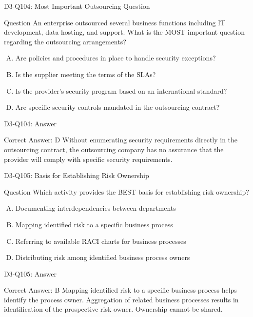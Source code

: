 \documentclass{beamer}
\begin{document}
	\begin{frame}{D3-Q104: Most Important Outsourcing Question}
		\begin{block}{Question}
			An enterprise outsourced several business functions including IT development, data hosting, and support. What is the MOST important question regarding the outsourcing arrangements?
		\end{block}
		\begin{enumerate}[(A)]
			\item Are policies and procedures in place to handle security exceptions?
			\item Is the supplier meeting the terms of the SLAs?
			\item Is the provider's security program based on an international standard?
			\item Are specific security controls mandated in the outsourcing contract?
		\end{enumerate}
	\end{frame}
	\begin{frame}{D3-Q104: Answer}
		\begin{block}{Correct Answer: D}
			Without enumerating security requirements directly in the outsourcing contract, the outsourcing company has no assurance that the provider will comply with specific security requirements.
		\end{block}
	\end{frame}
	
	\begin{frame}{D3-Q105: Basis for Establishing Risk Ownership}
		\begin{block}{Question}
			Which activity provides the BEST basis for establishing risk ownership?
		\end{block}
		\begin{enumerate}[(A)]
			\item Documenting interdependencies between departments
			\item Mapping identified risk to a specific business process
			\item Referring to available RACI charts for business processes
			\item Distributing risk among identified business process owners
		\end{enumerate}
	\end{frame}
	\begin{frame}{D3-Q105: Answer}
		\begin{block}{Correct Answer: B}
			Mapping identified risk to a specific business process helps identify the process owner. Aggregation of related business processes results in identification of the prospective risk owner. Ownership cannot be shared.
		\end{block}
	\end{frame}
	
\end{document}
